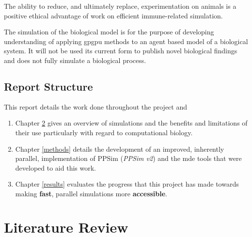 \documentclass{UoYCSproject}
\begin{document}
The ability to reduce, and ultimately replace, experimentation on animals is a positive ethical advantage of work on efficient immune-related simulation.

The simulation of the biological model is for the purpose of developing understanding of applying \gls{gpgpu} methods to an agent based model of a biological system. It will not be used its current form to publish novel biological findings and does not fully simulate a biological process.

\section{Report Structure}
This report details the work done throughout the project and 

\begin{enumerate}
    \item Chapter \ref{lit_review} gives an overview of simulations and the benefits and limitations of their use particularly with regard to computational biology.
    \item Chapter \ref{methods} details the development of an improved, inherently parallel, implementation of PPSim (\textit{PPSim v2}) and the \gls{mde} tools that were developed to aid this work.
    \item Chapter \ref{results} evaluates the progress that this project has made towards making \textbf{fast}, parallel simulations more \textbf{accessible}.
\end{enumerate}

\chapter{Literature Review}
\label{lit_review}
%
\end{document}

